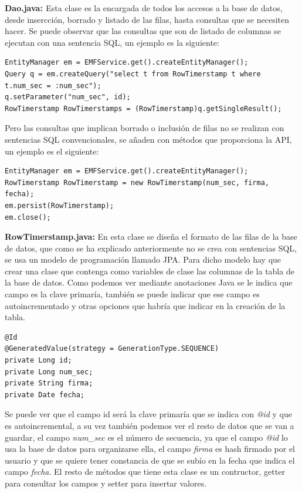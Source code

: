 \begin{description}
\item \textbf{Dao.java: \label{prueba}} Esta clase es la encargada de todos los accesos a la base de datos, desde insercción, borrado y listado de las filas, hasta consultas que se necesiten hacer. Se puede observar que las consultas que son de listado de columnas se ejecutan con una sentencia SQL, un ejemplo es la siguiente:
\begin{lstlisting}[style=Java]
EntityManager em = EMFService.get().createEntityManager();
Query q = em.createQuery("select t from RowTimerstamp t where t.num_sec = :num_sec");
q.setParameter("num_sec", id);
RowTimerstamp RowTimerstamps = (RowTimerstamp)q.getSingleResult();
\end{lstlisting}

Pero las consultas que implican borrado o inclusión de filas no se realizan con sentencias SQL convencionales, se añaden con métodos que proporciona la API, un ejemplo es el siguiente:
\begin{lstlisting}[style=Java]
EntityManager em = EMFService.get().createEntityManager();
RowTimerstamp RowTimerstamp = new RowTimerstamp(num_sec, firma, fecha);
em.persist(RowTimerstamp);
em.close();
\end{lstlisting}

\item \textbf{RowTimerstamp.java:} En esta clase se diseña el formato de las filas de la base de datos, que como se ha explicado anteriormente no se crea con sentencias SQL, se usa un modelo de programación llamado JPA. Para dicho modelo hay que crear una clase que contenga como variables de clase las columnas de la tabla de la base de datos. Como podemos ver mediante anotaciones Java se le indica que campo es la clave primaría, también se puede indicar que ese campo es autoincrementado y otras opciones que habría que indicar en la creación de la tabla.   

\begin{lstlisting}[style=Java]
@Id
@GeneratedValue(strategy = GenerationType.SEQUENCE)
private Long id;
private Long num_sec;
private String firma;
private Date fecha;
\end{lstlisting}

Se puede ver que el campo id será la clave primaría que se indica con \textit{@id} y que es autoincremental, a su vez también podemos ver el resto de datos que se van a guardar, el campo \textit{num\_sec} es el número de secuencia, ya que el campo \textit{@id} lo usa la base de datos para organizarse ella, el campo \textit{firma} es hash firmado por el usuario y que se quiere tener constancia de que se subío en la fecha que indica el campo \textit{fecha}.
El resto de métodos que tiene esta clase es un contructor, getter para consultar los campos y setter para insertar valores.


\end{description}
